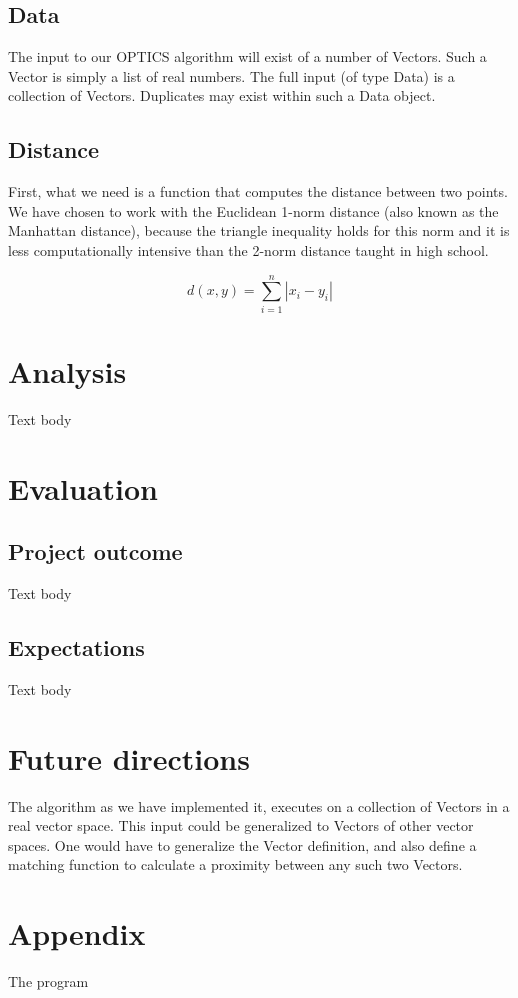 \documentclass[12pt,a4paper]{article}
\begin{document}
\subsection{Data}
The input to our OPTICS algorithm will exist of a number of Vectors. Such a Vector is simply a list of real numbers. The full input (of type Data) is a collection of Vectors. Duplicates may exist within such a Data object.

\subsection{Distance}
First, what we need is a function that computes the distance between two points. We have chosen to work with the Euclidean 1-norm distance (also known as the Manhattan distance), because the triangle inequality holds for this norm and it is less computationally intensive than the 2-norm distance taught in high school.

\begin{equation}
d(x,y)=\sum_{i=1}^n |x_i-y_i|
\end{equation}

\clearpage
\section{Analysis}
Text body

\section{Evaluation}
\subsection{Project outcome}
Text body
\subsection{Expectations}
Text body

\section{Future directions}
The algorithm as we have implemented it, executes on a collection of Vectors in a real vector space. This input could be generalized to Vectors of other vector spaces. One would have to generalize the Vector definition, and also define a matching function to calculate a proximity between any such two Vectors.

\clearpage
\section{Appendix}
The program
\end{document}
